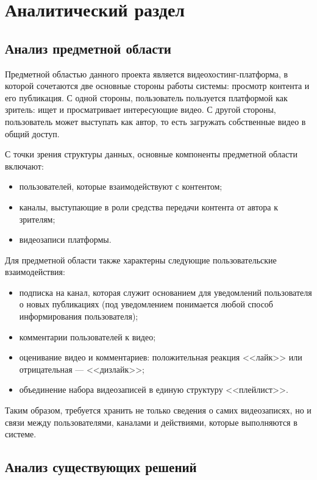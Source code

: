 \chapter{Аналитический раздел}


\section{Анализ предметной области}

Предметной областью данного проекта является видеохостинг-платформа, в которой сочетаются две основные стороны работы системы: просмотр контента и его публикация.
С одной стороны, пользователь пользуется платформой как зритель: ищет и просматривает интересующие видео.
С другой стороны, пользователь может выступать как автор, то есть загружать собственные видео в общий доступ.

С точки зрения структуры данных, основные компоненты предметной области включают:
\begin{itemize}
    \item пользователей, которые взаимодействуют с контентом;
    \item каналы, выступающие в роли средства передачи контента от автора к зрителям;
    \item видеозаписи платформы.
\end{itemize}

Для предметной области также характерны следующие пользовательские взаимодействия:
\begin{itemize}
    \item подписка на канал, которая служит основанием для уведомлений пользователя о новых публикациях (под уведомлением понимается любой способ информирования пользователя);
    \item комментарии пользователей к видео;
    \item оценивание видео и комментариев: положительная реакция <<лайк>> или отрицательная --- <<дизлайк>>;
    \item объединение набора видеозаписей в единую структуру <<плейлист>>.
\end{itemize}

Таким образом, требуется хранить не только сведения о самих видеозаписях, но и связи между пользователями, каналами и действиями, которые выполняются в системе.


\section{Анализ существующих решений}


